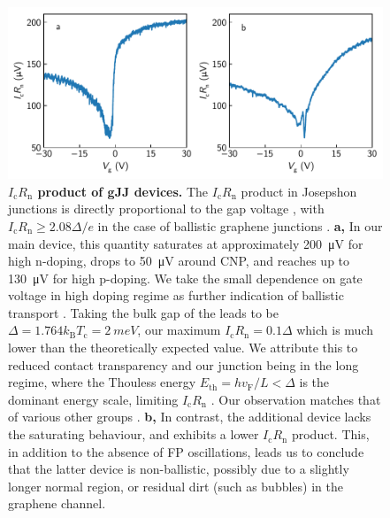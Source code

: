 \begin{figure}[]
	\centering
	\includegraphics[width=\linewidth]{chapter-gJJ/figs/si_icrn}
	\caption{{\bf $I_\text{c} R_\text{n}$ product of gJJ devices.}
		The $I_\text{c} R_\text{n}$ product in Josepshon junctions is directly proportional to the gap voltage \cite{tinkhamIntroductionSuperconductivity1996}, with $I_\text{c} R_\text{n}\geq2.08\Delta/e$ in the case of ballistic graphene junctions \cite{titovJosephsonEffectBallistic2006b,cuevasSubharmonicGapStructure2006a}.
		\textbf{a,} In our main device, this quantity saturates at approximately \SI{200}{\micro V} for high n-doping, drops to \SI{50}{\micro V} around CNP, and reaches up to \SI{130}{\micro V} for high p-doping.
		We take the small dependence on gate voltage in high doping regime as further indication of ballistic transport \cite{mizunoBallisticlikeSupercurrentSuspended2013a,zhuSupercurrentMultipleAndreev2018}.
		Taking the bulk gap of the leads to be $\Delta=1.764 k_\text{B} T_\text{c} = \SI{2}{meV}$, our maximum $I_\text{c} R_\text{n}=0.1\Delta$ which is much lower than the theoretically expected value.
		We attribute this to reduced contact transparency and our junction being in the long regime, where the Thouless energy $E_\text{th}=hv_\text{F}/L < \Delta $ is the dominant energy scale, limiting $I_\text{c} R_\text{n}$ \cite{dubosJosephsonCriticalCurrent2001}.
		Our observation matches that of various other groups \cite{mizunoBallisticlikeSupercurrentSuspended2013a,benshalomQuantumOscillationsCritical2015,borzenetsBallisticGrapheneJosephson2016a,zhuSupercurrentMultipleAndreev2018}.
		\textbf{b,} In contrast, the additional device lacks the saturating behaviour, and exhibits a lower $I_\text{c}R_\text{n}$ product.
		This, in addition to the absence of FP oscillations, leads us to conclude that the latter device is non-ballistic, possibly due to a slightly longer normal region, or residual dirt (such as bubbles) in the graphene channel.
	}
	\label{fig:icrn}
\end{figure}

